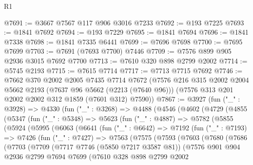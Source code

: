 \begin{lexlean}{R1}
\begin{coremodule}
@7691 := @3667 @7567 @117 @906 @3016 @7233
@7692 := @193 @7225
@7693 := @1841 @7692
@7694 := @193 @7229
@7695 := @1841 @7694
@7696 := @1841 @7338
@7698 := @1841 @7335 @6441
@7699 := @7696 @7698
@7700 := @7695 @7699
@7703 := @7691 (@7693 @7700) @7446
@7709 := @7576 @899 @905 @2936 @3015 @7692 @7700
@7713 := @7610 @320 @898 @2799 @2002
@7714 := @5745 @2193
@7715 := @7615 @7714
@7717 := @7713 @7715 @7692
@7746 := @7662
    @370
    @2002
    @2005
    @7435
    @7714
    @7672
    (@7576
      @216
      @315
      @2002
      @2004
      @5662
      @2193
      (@7637 @96 @5662 (@2213 (@7640 @96)))
      (@7576 @313 @201 @2002 @2002 @312 @1859 (@7601 @312) @7590))
@7867 := @3927
    (fun ("_" : @3928) =>
    @4330
      (fun ("_" : @3268) =>
      @4488
        (@4546
          (@4602
            (@4729
              (@4855
                (@5347
                  (fun ("_" : @5348) =>
                  @5623
                    (fun ("_" : @4887) =>
                    @5782
                      (@5855
                        (@5924
                          (@5995
                            (@6063
                              (@6641
                                (fun ("_" : @6642) =>
                                @7192
                                  (fun ("_" : @7193) =>
                                  @7426
                                    (fun ("_" : @7427) =>
                                    @7563
                                      (@7575
                                        (@7593
                                          (@7603
                                            (@7680
                                              (@7686
                                                (@7703
                                                  (@7709
                                                    (@7717 @7746 (@5850 @7217 @3587 @81))
                                                    (@7576
                                                      @901
                                                      @904
                                                      @2936
                                                      @2799
                                                      @7694
                                                      @7699
                                                      (@7610
                                                        @328
                                                        @898
                                                        @2799
                                                        @2002

\end{coremodule}
\end{lexlean}
